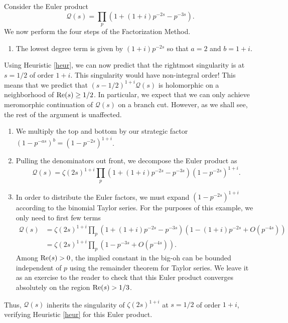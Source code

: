\documentclass[12pt]{amsart}
\newenvironment{BOXexample}{
\begin{exbox}\mbox{}
\begin{example}
}
{
\end{example}
\end{exbox}
}
\theoremstyle{plain}
\begin{document}
\begin{BOXexample}\label{ex:complex_pole}
Consider the Euler product
\[
\mathcal{Q}(s) = \prod_p (1 + (1+i)p^{-2s} - p^{-3s}).
\]
We now perform the four steps of the Factorization Method.
\begin{enumerate}[(1)]
    \item The lowest degree term is given by $(1+i)p^{-2s}$ so that $a=2$ and $b=1+i$.
\end{enumerate}
Using Heuristic \ref{heur}, we can now predict that the rightmost singularity is at $s=1/2$ of order $1+i$. This singularity would have non-integral order! This means that we predict that $(s-1/2)^{1+i}\mathcal{Q}(s)$ is holomorphic on a neighborhood of ${\rm Re}(s) \ge 1/2$. In particular, we expect that we can only achieve meromorphic continuation of $\mathcal{Q}(s)$ on a branch cut. However, as we shall see, the rest of the argument is unaffected.

\begin{enumerate}
    \item[(2)] We multiply the top and bottom by our strategic factor $(1-p^{-as})^b = (1-p^{-2s})^{1+i}$.
    \item[(3)] Pulling the denominators out front, we decompose the Euler product as
    \[
    \mathcal{Q}(s) = \zeta(2s)^{1+i}\prod_p (1 + (1+i)p^{-2s} - p^{-3s})(1-p^{-2s})^{1+i}.
    \]
    \item [(4)] In order to distribute the Euler factors, we must expand $(1-p^{-2s})^{1+i}$ according to the binomial Taylor series. For the purposes of this example, we only need to first few terms
    \begin{align*}
        \mathcal{Q}(s) &= \zeta(2s)^{1+i}\prod_p (1 + (1+i)p^{-2s} - p^{-3s})\left(1 - (1+i)p^{-2s} + O(p^{-4s})\right)\\
        &= \zeta(2s)^{1+i}\prod_p \left(1 - p^{-3s} + O(p^{-4s})\right).
    \end{align*}
    Among ${\rm Re}(s)>0$, the implied constant in the big-oh can be bounded independent of $p$ using the remainder theorem for Taylor series. We leave it as an exercise to the reader to check that this Euler product converges absolutely on the region ${\rm Re}(s) > 1/3$.
\end{enumerate}

Thus, $\mathcal{Q}(s)$ inherits the singularity of $\zeta(2s)^{1+i}$ at $s=1/2$ of order $1+i$, verifying Heuristic \ref{heur} for this Euler product.
\end{BOXexample}
\end{document}
